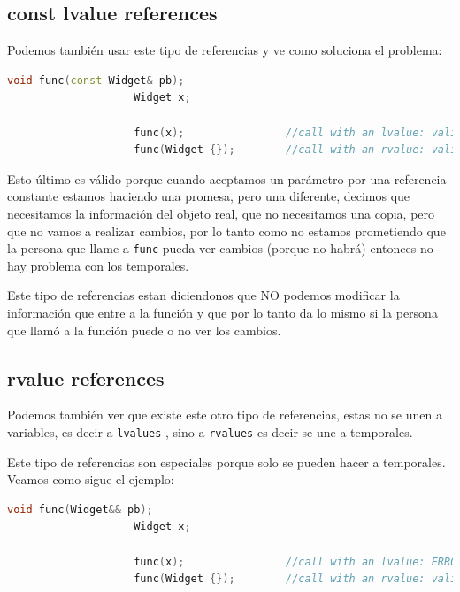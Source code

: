 \documentclass[12pt, fleqn]{report}                             %
\theoremstyle{break}                                            %
\newcommand{\textCode}[1]  { \texttt{#1} }                      %
\begin{document}
            \subsection{const lvalue references}  
            
                Podemos también usar este tipo de referencias y ve como soluciona el problema:
                \begin{lstlisting}[language=C++, gobble=20]
                    void func(const Widget& pb);
                    Widget x;

                    func(x);                //call with an lvalue: valid :)
                    func(Widget {});        //call with an rvalue: valid :)
                \end{lstlisting}

                Esto último es válido porque cuando aceptamos un parámetro por una referencia constante
                estamos haciendo una promesa, pero una diferente, decimos que necesitamos la información
                del objeto real, que no necesitamos una copia, pero que no vamos a realizar cambios, por
                lo tanto como no estamos prometiendo que la persona que llame a \textCode{func}
                pueda ver cambios (porque no habrá) entonces no hay problema con los temporales.

                Este tipo de referencias estan diciendonos que NO podemos modificar la información
                que entre a la función y que por lo tanto da lo mismo si la persona que 
                llamó a la función puede o no ver los cambios.
            
            \subsection{rvalue references}   

                Podemos también ver que existe este otro tipo de referencias, estas
                no se unen a variables, es decir a \textCode{lvalues}, sino a \textCode{rvalues}
                es decir se une a temporales. 

                Este tipo de referencias son especiales porque solo se pueden hacer a temporales.
                Veamos como sigue el ejemplo:
                \begin{lstlisting}[language=C++, gobble=20]
                    void func(Widget&& pb);
                    Widget x;

                    func(x);                //call with an lvalue: ERROR :(
                    func(Widget {});        //call with an rvalue: valid :)
                \end{lstlisting}
\end{document}
